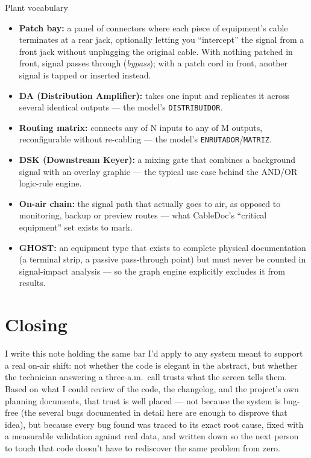 \documentclass[10.4pt,twocolumn]{article}
\begin{document}
\begin{specbox}{Plant vocabulary}
\begin{itemize}[leftmargin=1.0em,itemsep=2pt,topsep=2pt]
\item \textbf{Patch bay:} a panel of connectors where each piece of equipment's cable terminates at a rear jack, optionally letting you ``intercept'' the signal from a front jack without unplugging the original cable. With nothing patched in front, signal passes through (\emph{bypass}); with a patch cord in front, another signal is tapped or inserted instead.
\item \textbf{DA (Distribution Amplifier):} takes one input and replicates it across several identical outputs --- the model's \texttt{DISTRIBUIDOR}.
\item \textbf{Routing matrix:} connects any of N inputs to any of M outputs, reconfigurable without re-cabling --- the model's \texttt{ENRUTADOR}/\texttt{MATRIZ}.
\item \textbf{DSK (Downstream Keyer):} a mixing gate that combines a background signal with an overlay graphic --- the typical use case behind the AND/OR logic-rule engine.
\item \textbf{On-air chain:} the signal path that actually goes to air, as opposed to monitoring, backup or preview routes --- what CableDoc's ``critical equipment'' set exists to mark.
\item \textbf{GHOST:} an equipment type that exists to complete physical documentation (a terminal strip, a passive pass-through point) but must never be counted in signal-impact analysis --- so the graph engine explicitly excludes it from results.
\end{itemize}
\end{specbox}

\section{Closing}

I write this note holding the same bar I'd apply to any system meant to support a real on-air shift: not whether the code is elegant in the abstract, but whether the technician answering a three-a.m.\ call trusts what the screen tells them. Based on what I could review of the code, the changelog, and the project's own planning documents, that trust is well placed --- not because the system is bug-free (the several bugs documented in detail here are enough to disprove that idea), but because every bug found was traced to its exact root cause, fixed with a measurable validation against real data, and written down so the next person to touch that code doesn't have to rediscover the same problem from zero.
\end{document}
